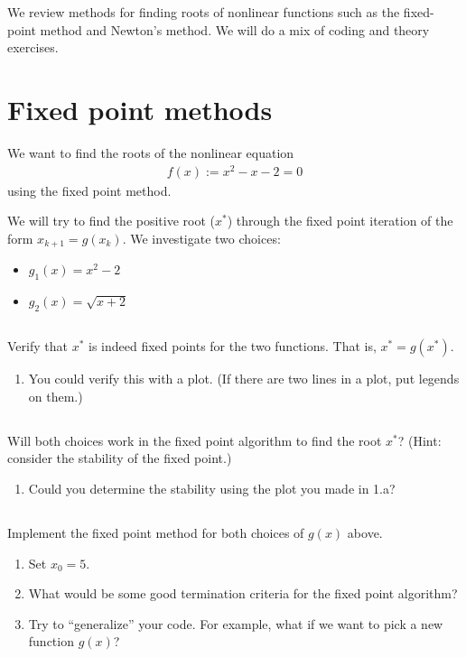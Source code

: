 \documentclass[11pt,letterpaper]{article}
\begin{document}
We review methods for finding roots of nonlinear functions such as the fixed-point method and Newton's method. We will do a mix of coding and theory exercises. 

\section{Fixed point methods}
We want to find the roots of the nonlinear equation
\begin{align*}
    f(x) := x^2-x-2 = 0
\end{align*}
using the fixed point method.

\vspace{1cm}
We will try to find the positive root ($x^*$) through the fixed point iteration of the form $x_{k+1} = g(x_k)$. We investigate two choices:
\begin{itemize}
    \item $g_1(x) = x^2-2$
    \item $g_2(x) = \sqrt{x+2}$
\end{itemize}

\subsection{}\label{sec:1c}
Verify that $x^*$ is indeed fixed points for the two functions. That is, $x^* = g(x^*)$. 
\begin{enumerate}
    \item You could verify this with a plot. (If there are two lines in a plot, put legends on them.)
\end{enumerate}

\subsection{}
Will both choices work in the fixed point algorithm to find the root $x^*$? (Hint: consider the stability of the fixed point.)
\begin{enumerate}
    \item Could you determine the stability using the plot you made in 1.a?
\end{enumerate}

\subsection{}
Implement the fixed point method for both choices of $g(x)$ above. 
\begin{enumerate}
    \item Set $x_0 = 5$.
    \item What would be some good termination criteria for the fixed point algorithm?
    \item Try to ``generalize'' your code. For example, what if we want to pick a new function $g(x)$?
\end{enumerate}
\end{document}
